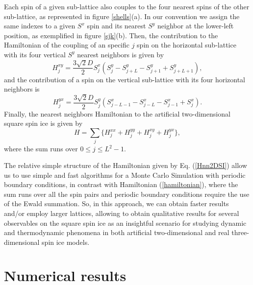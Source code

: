 \documentclass[aps,showkeys,groupedaddress]{revtex4}
\begin{document}
Each spin of a given sub-lattice also couples to the four nearest spins of the other sub-lattice, as represented in figure \ref{shells}(a). In our convention we assign the same indexes to a given $S^x$ spin and its nearest $S^y$ neighbor at the lower-left position, as exemplified in figure \ref{sjk}(b). Then, the contribution to the Hamiltonian of the coupling of an specific $j$ spin on the horizontal sub-lattice with its four vertical $S^y$ nearest neighbors is given by
\begin{equation}
H^{xy}_{j} = \frac{3 \sqrt{2} D}{2} S^x_{j} (S^y_{j} - S^y_{j+L} - S^y_{j+1} + S^y_{j+L+1}),
\end{equation}
and the contribution of a spin on the vertical sub-lattice with its four horizontal neighbors is
\begin{equation}
H^{yx}_{j} = \frac{3 \sqrt{2} D}{2} S^y_{j} (S^x_{j-L-1} - S^x_{j-L} - S^x_{j-1} + S^x_{j}).
\end{equation}
Finally, the nearest neighbors Hamiltonian to the artificial two-dimensional square spin ice is given by
\begin{equation}
H=\sum_{j} \Big\{ H^{xx}_{j} + H^{yy}_{j} + H^{xy}_{j} + H^{yx}_{j} \Big\}, \label{Hnn2DSI}
\end{equation}
where the sum runs over  $0 \leq j \leq L^2-1$.

The relative simple structure of the Hamiltonian given by Eq. (\ref{Hnn2DSI}) allow us to use simple and fast algorithms for a Monte Carlo Simulation with periodic boundary conditions, in contrast with Hamiltonian (\ref{hamiltonian}), where the sum runs over all the spin pairs and periodic boundary conditions require the use of the Ewald summation. So, in this approach, we can obtain faster results and/or employ larger lattices, allowing to obtain qualitative results for several observables on the square spin ice as an insightful scenario for studying dynamic and thermodynamic phenomena in both artificial two-dimensional and real three-dimensional spin ice models. 


\section{Numerical results} \label{nr}
\end{document}
